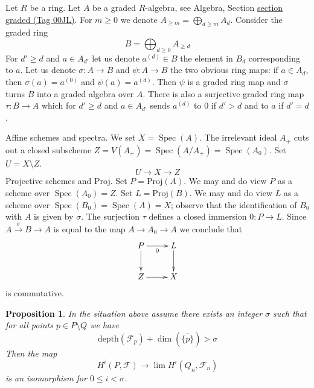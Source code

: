 \documentclass{amsart}
\theoremstyle{plain}
\newtheorem{proposition}[subsection]{Proposition}
\theoremstyle{definition}
\theoremstyle{remark}
\numberwithin{equation}{subsection}
\def\lim{\mathop{\mathrm{lim}}\nolimits}
\def\Spec{\mathop{\mathrm{Spec}}}
\begin{document}
\medskip\noindent
Let $R$ be a ring. Let $A$ be a graded $R$-algebra, see
Algebra, Section \href{https://stacks.math.columbia.edu/tag/00JL}{section graded (Tag 00JL)}.
For $m \geq 0$ we denote $A_{\geq m} = \bigoplus_{d \geq m} A_d$.
Consider the graded ring
$$
B = \bigoplus\nolimits_{d \geq 0} A_{\geq d}
$$
For $d' \geq d$ and $a \in A_{d'}$ let us denote $a^{(d)} \in B$
the element in $B_d$ corresponding to $a$.
Let us denote $\sigma : A \to B$ and $\psi : A \to B$
the two obvious ring maps: if $a \in A_d$, then
$\sigma(a) = a^{(0)}$ and $\psi(a) = a^{(d)}$.
Then $\psi$ is a graded ring map and $\sigma$ turns $B$
into a graded algebra over $A$. There is also a
surjective graded ring map $\tau : B \to A$
which for $d' \geq d$ and $a \in A_{d'}$ sends
$a^{(d)}$ to $0$ if $d' > d$ and to $a$ if $d' = d$.

\medskip\noindent
Affine schemes and spectra.
We set $X = \Spec(A)$. The irrelevant ideal $A_+$ cuts out a closed subscheme
$Z = V(A_+) = \Spec(A/A_+) = \Spec(A_0)$. Set $U = X \setminus Z$.
$$
U \longrightarrow X \longrightarrow Z
$$
Projective schemes and Proj. Set $P = \text{Proj}(A)$. We may
and do view $P$ as a scheme over $\Spec(A_0) = Z$.
Set $L = \text{Proj}(B)$. We may and do view $L$ as a scheme
over $\Spec(B_0) = \Spec(A) = X$; observe that the identification
of $B_0$ with $A$ is given by $\sigma$.
The surjection $\tau$ defines a closed immersion $0 : P \to L$.
Since $A \xrightarrow{\sigma} B \to A$ is equal to the map $A \to A_0 \to A$
we conclude that
$$
\xymatrix{
P \ar[d] \ar[r]_0 & L \ar[d] \\
Z \ar[r] & X
}
$$
is commutative.


\begin{proposition}
\label{proposition-lefschetz}
In the situation above assume there exists an integer $\sigma$ such that
for all points $p \in P \setminus Q$ we have
$$
\text{depth}(\mathcal{F}_p) + \dim(\overline{\{p\}}) > \sigma
$$
Then the map
$$
H^i(P, \mathcal{F}) \longrightarrow \lim H^i(Q_n, \mathcal{F}_n)
$$
is an isomorphism for $0 \leq i < \sigma$.
\end{proposition}
\end{document}
